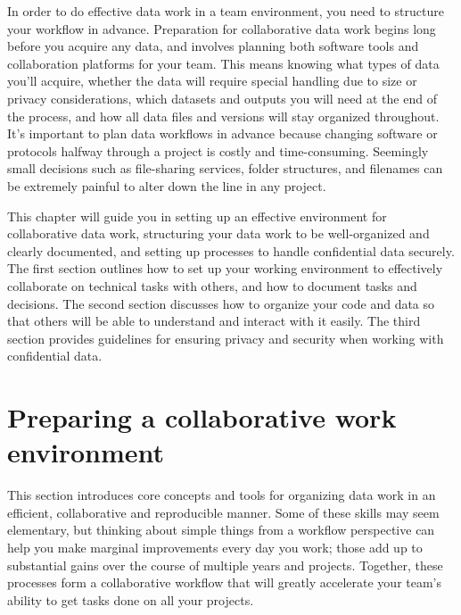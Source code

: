
\begin{fullwidth}
In order to do effective data work in a team environment,
you need to structure your workflow in advance.
Preparation for collaborative data work begins long before you acquire any data,
and involves planning both software tools and collaboration platforms for your team.
This means knowing what types of data you'll acquire,
whether the data will require special handling due to size or privacy considerations,
which datasets and outputs you will need at the end of the process,
and how all data files and versions will stay organized throughout.
It's important to plan data workflows in advance because
changing software or protocols halfway through a project is costly and time-consuming.
Seemingly small decisions such as file-sharing services, folder structures,
and filenames can be extremely painful to alter down the line in any project.

This chapter will guide you in setting up an effective environment for collaborative data work,
structuring your data work to be well-organized and clearly documented,
and setting up processes to handle confidential data securely.
The first section outlines how to set up your working environment
to effectively collaborate on technical tasks with others,
and how to document tasks and decisions.
The second section discusses how to organize your code and data so that others
will be able to understand and interact with it easily.
The third section provides guidelines for ensuring
privacy and security when working with confidential data.

\end{fullwidth}


\section{Preparing a collaborative work environment}

This section introduces core concepts and tools
for organizing data work in an efficient, collaborative and reproducible manner.
Some of these skills may seem elementary,
but thinking about simple things from a workflow perspective
can help you make marginal improvements every day you work;
those add up to substantial gains over the course of multiple years and projects.
Together, these processes form a collaborative workflow
that will greatly accelerate your team's ability to get tasks done
on all your projects.


